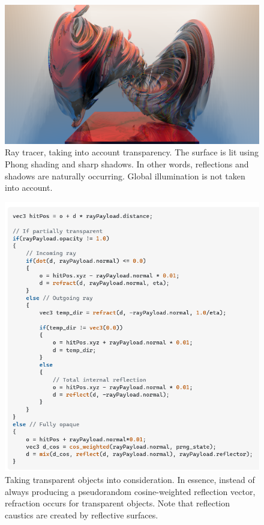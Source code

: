 \documentclass[12pt]{article}
\begin{document}
\begin{figure} 
\centering
  \includegraphics[width = 6 in]{v_rt_reflect.png}
  \caption{ Ray tracer, taking into account transparency.
The surface is lit using Phong shading and sharp shadows.
In other words, reflections and shadows are naturally occurring.
Global illumination is not taken into account.
}
\end{figure}


\begin{figure} 
\centering
  \includegraphics[width = 6 in]{code.png}
  \caption{ Taking transparent objects into consideration.
In essence, instead of always producing a pseudorandom cosine-weighted reflection vector, refraction occurs for transparent objects.
Note that reflection caustics are created by reflective surfaces.
}
\end{figure}
\end{document}
